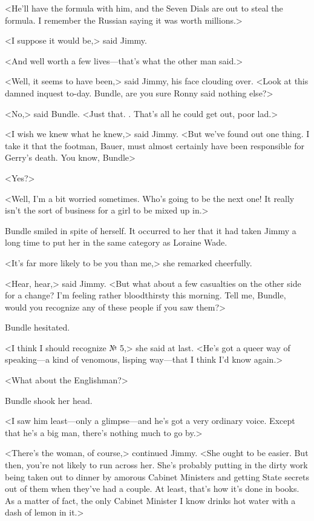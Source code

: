 <He'll have the formula with him, and the Seven Dials are out to steal the formula. I remember the Russian saying it was worth millions.>

<I suppose it would be,> said Jimmy.

<And well worth a few lives—that's what the other man said.>

<Well, it seems to have been,> said Jimmy, his face clouding over. <Look at this damned inquest to-day. Bundle, are you sure Ronny said nothing else?>

<No,> said Bundle. <Just that. . That's all he could get out, poor lad.>

<I wish we knew what he knew,> said Jimmy. <But we've found out one thing. I take it that the footman, Bauer, must almost certainly have been responsible for Gerry's death. You know, Bundle\longdash>

<Yes?>

<Well, I'm a bit worried sometimes. Who's going to be the next one! It really isn't the sort of business for a girl to be mixed up in.>

Bundle smiled in spite of herself. It occurred to her that it had taken Jimmy a long time to put her in the same category as Loraine Wade.

<It's far more likely to be you than me,> she remarked cheerfully.

<Hear, hear,> said Jimmy. <But what about a few casualties on the other side for a change? I'm feeling rather bloodthirsty this morning. Tell me, Bundle, would you recognize any of these people if you saw them?>

Bundle hesitated.

<I think I should recognize № 5,> she said at last. <He's got a queer way of speaking—a kind of venomous, lisping way—that I think I'd know again.>

<What about the Englishman?>

Bundle shook her head.

<I saw him least—only a glimpse—and he's got a very ordinary voice. Except that he's a big man, there's nothing much to go by.>

<There's the woman, of course,> continued Jimmy. <She ought to be easier. But then, you're not likely to run across her. She's probably putting in the dirty work being taken out to dinner by amorous Cabinet Ministers and getting State secrets out of them when they've had a couple. At least, that's how it's done in books. As a matter of fact, the only Cabinet Minister I know drinks hot water with a dash of lemon in it.>

